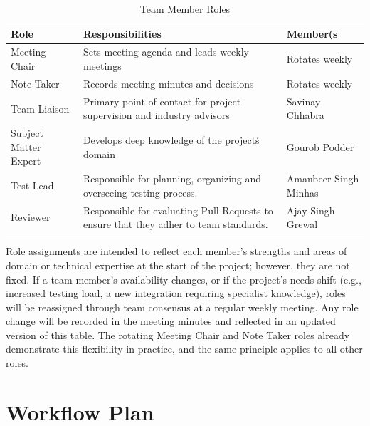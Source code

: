 \documentclass{article}
\begin{document}
\begin{table}[!h]
\caption{Team Member Roles} \label{TblMemberRoles}
\begin{tabularx}{\textwidth}{lXl}
\toprule
\textbf{Role} & \textbf{Responsibilities} & \textbf{Member(s}\\
\midrule
Meeting Chair & Sets meeting agenda and leads weekly meetings & Rotates weekly\\
Note Taker & Records meeting minutes and decisions & Rotates weekly\\
Team Liaison & Primary point of contact for project supervision and industry advisors & Savinay Chhabra \\
Subject Matter Expert & Develops deep knowledge of the project\'s domain & Gourob Podder \\
Test Lead & Responsible for planning, organizing and overseeing testing process. & Amanbeer Singh Minhas \\
Reviewer & Responsible for evaluating Pull Requests to ensure that they adher to team standards. & Ajay Singh Grewal \\
\bottomrule
\end{tabularx}
\end{table}

Role assignments are intended to reflect each member's strengths and areas of domain or technical expertise at the start of the project; however, they are not fixed. If a team member's availability changes, or if the project's needs shift (e.g., increased testing load, a new integration requiring specialist knowledge), roles will be reassigned through team consensus at a regular weekly meeting. Any role change will be recorded in the meeting minutes and reflected in an updated version of this table. The rotating Meeting Chair and Note Taker roles already demonstrate this flexibility in practice, and the same principle applies to all other roles.

\section{Workflow Plan}
\end{document}

